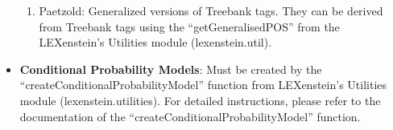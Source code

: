 \begin{itemize}
\begin{enumerate}
				\item Paetzold: Generalized versions of Treebank tags. They can be derived from Treebank tags using the ``getGeneralisedPOS'' from the LEXenstein's Utilities module (lexenstein.util).
			\end{enumerate}
	
	\item \textbf{Conditional Probability Models}: Must be created by the ``createConditionalProbabilityModel'' function from LEXenstein's Utilities module (lexenstein.utilities). For detailed instructions, please refer to the documentation of the ``createConditionalProbabilityModel'' function.
\end{itemize}
